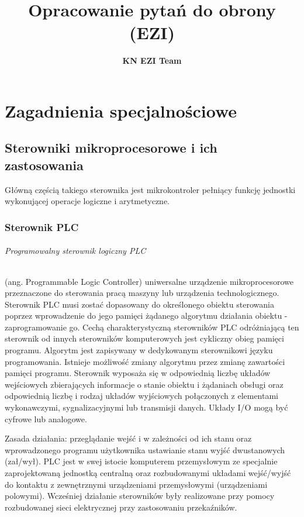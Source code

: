 \documentclass[a4paper,twoside]{report}
\author{\textbf{KN EZI Team}}
\title{Opracowanie pytań do obrony (EZI)}
\begin{document}
\maketitle
\tableofcontents %
\thispagestyle{empty}


\part{Zagadnienia specjalnościowe}
\bigskip
\chapter{Sterowniki mikroprocesorowe i ich zastosowania}

Główną częścią takiego sterownika jest mikrokontroler pełniący funkcję jednostki wykonującej operacje logiczne i arytmetyczne.

\section{Sterownik PLC}

\paragraph{Programowalny sterownik logiczny PLC} (ang. Programmable Logic Controller) uniwersalne urządzenie mikroprocesorowe przeznaczone do sterowania pracą maszyny lub urządzenia technologicznego. Sterownik PLC musi zostać dopasowany do określonego obiektu sterowania poprzez wprowadzenie do jego pamięci żądanego algorytmu działania obiektu - zaprogramowanie go. Cechą charakterystyczną sterowników PLC odróżniającą ten sterownik od innych sterowników komputerowych jest cykliczny obieg pamięci programu. Algorytm jest zapisywany w dedykowanym sterownikowi języku programowania. Istnieje możliwość zmiany algorytmu przez zmianę zawartości pamięci programu. Sterownik wyposaża się w odpowiednią liczbę układów wejściowych zbierających informacje o stanie obiektu i żądaniach obsługi oraz odpowiednią liczbę i rodzaj układów wyjściowych połączonych z elementami wykonawczymi, sygnalizacyjnymi lub transmisji danych. Układy I/O mogą być cyfrowe lub analogowe.

Zasada działania: przeglądanie wejść i w zależności od ich stanu oraz
wprowadzonego programu użytkownika ustawianie stanu wyjść dwustanowych (zał/wył).
PLC jest w swej istocie komputerem przemysłowym ze specjalnie zaprojektowaną jednostką centralną oraz rozbudowanymi układami wejść/wyjść do kontaktu z zewnętrznymi urządzeniami przemysłowymi (urządzeniami polowymi). Wcześniej działanie sterowników były realizowane przy pomocy rozbudowanej sieci elektrycznej przy zastosowaniu przekaźników.
\end{document}
